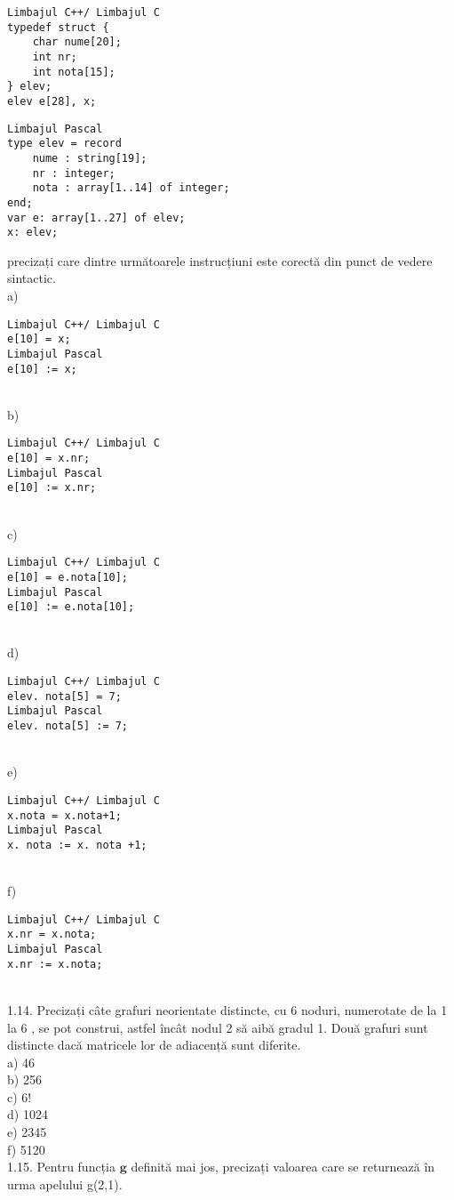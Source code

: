 \begin{verbatim}
Limbajul C++/ Limbajul C
typedef struct {
    char nume[20];
    int nr;
    int nota[15];
} elev;
elev e[28], x;
\end{verbatim}
\begin{verbatim}
Limbajul Pascal
type elev = record
    nume : string[19];
    nr : integer;
    nota : array[1..14] of integer;
end;
var e: array[1..27] of elev;
x: elev;
\end{verbatim}
precizați care dintre următoarele instrucțiuni este corectă din punct de vedere sintactic.
\\
a) \begin{verbatim}
Limbajul C++/ Limbajul C
e[10] = x;
Limbajul Pascal
e[10] := x;
\end{verbatim}
\\
b) \begin{verbatim}
Limbajul C++/ Limbajul C
e[10] = x.nr;
Limbajul Pascal
e[10] := x.nr;
\end{verbatim}
\\
c) \begin{verbatim}
Limbajul C++/ Limbajul C
e[10] = e.nota[10];
Limbajul Pascal
e[10] := e.nota[10];
\end{verbatim}
\\
d) \begin{verbatim}
Limbajul C++/ Limbajul C
elev. nota[5] = 7;
Limbajul Pascal
elev. nota[5] := 7;
\end{verbatim}
\\
e) \begin{verbatim}
Limbajul C++/ Limbajul C
x.nota = x.nota+1;
Limbajul Pascal
x. nota := x. nota +1;
\end{verbatim}
\\
f) \begin{verbatim}
Limbajul C++/ Limbajul C
x.nr = x.nota;
Limbajul Pascal
x.nr := x.nota;
\end{verbatim}
\\
1.14. Precizați câte grafuri neorientate distincte, cu 6 noduri, numerotate de la 1 la 6 , se pot construi, astfel încât nodul 2 să aibă gradul 1. Două grafuri sunt distincte dacă matricele lor de adiacență sunt diferite.
\\
a) 46
\\
b) 256
\\
c) $6!$
\\
d) 1024
\\
e) 2345
\\
f) 5120
\\
1.15. Pentru funcția $\mathbf{g}$ definită mai jos, precizați valoarea care se returnează în urma apelului g(2,1).
